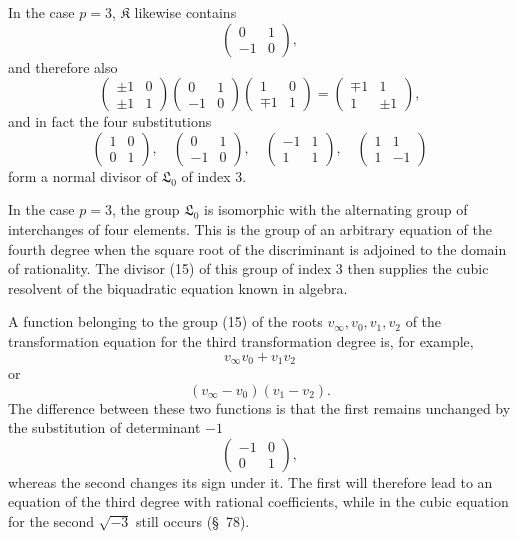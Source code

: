 \documentclass[11pt]{article}
\providecommand{\Lzero}{\mathfrak L_0}
\providecommand{\Kgrp}{\mathfrak K}
\begin{document}
In the case $p=3$, $\Kgrp$ likewise contains
\[
 \begin{pmatrix}0&1\\-1&0\end{pmatrix},
\]
and therefore also
\[
 \begin{pmatrix}\pm1&0\\\pm1&1\end{pmatrix}
 \begin{pmatrix}0&1\\-1&0\end{pmatrix}
 \begin{pmatrix}1&0\\\mp1&1\end{pmatrix}
 =
 \begin{pmatrix}\mp1&1\\1&\pm1\end{pmatrix},
\]
and in fact the four substitutions
\begin{equation}
 \begin{pmatrix}1&0\\0&1\end{pmatrix},
 \quad
 \begin{pmatrix}0&1\\-1&0\end{pmatrix},
 \quad
 \begin{pmatrix}-1&1\\1&1\end{pmatrix},
 \quad
 \begin{pmatrix}1&1\\1&-1\end{pmatrix}
\tag{15}
\end{equation}
form a normal divisor of $\Lzero$ of index $3$.

In the case $p=3$, the group $\Lzero$ is isomorphic with the alternating group of interchanges of four elements. This is the group of an arbitrary equation of the fourth degree when the square root of the discriminant is adjoined to the domain of rationality. The divisor (15) of this group of index $3$ then supplies the cubic resolvent of the biquadratic equation known in algebra.

A function belonging to the group (15) of the roots $v_\infty,v_0,v_1,v_2$ of the transformation equation for the third transformation degree is, for example,
\[
 v_\infty v_0+v_1v_2
\]
or
\[
 (v_\infty-v_0)(v_1-v_2).
\]
The difference between these two functions is that the first remains unchanged by the substitution of determinant $-1$
\[
 \begin{pmatrix}-1&0\\0&1\end{pmatrix},
\]
whereas the second changes its sign under it. The first will therefore lead to an equation of the third degree with rational coefficients, while in the cubic equation for the second $\sqrt{-3}$ still occurs (\S~78).
\end{document}
